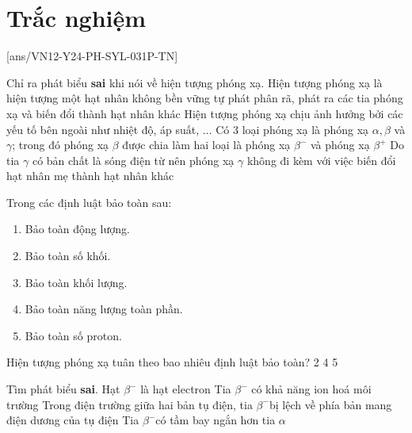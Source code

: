 \let\lesson\undefined
\newcommand{\lesson}{\phantomlesson{Bài 17.}}
\let\lesson\undefined
\newcommand{\lesson}{\phantomlesson{Bài 17.}}


\setcounter{section}{2}
\section{Trắc nghiệm}
[ans/VN12-Y24-PH-SYL-031P-TN]
\setcounter{ex}{0}
\begin{ex}
	Chỉ ra phát biểu \textbf{sai} khi nói về hiện tượng phóng xạ.
	\choice
	{Hiện tượng phóng xạ là hiện tượng một hạt nhân không bền vững tự phát phân rã, phát ra các tia phóng xạ và biến đổi thành hạt nhân khác}
	{\True Hiện tượng phóng xạ chịu ảnh hưởng bởi các yếu tố bên ngoài như nhiệt độ, áp suất, $\dots$}
	{Có 3 loại phóng xạ là phóng xạ $\alpha, \beta$ và $\gamma$; trong đó phóng xạ $\beta$ được chia làm hai loại là phóng xạ $\beta^-$ và phóng xạ $\beta^{+}$}
	{Do tia $\gamma$ có bản chất là sóng điện từ nên phóng xạ $\gamma$ không đi kèm với việc biến đổi hạt nhân mẹ thành hạt nhân khác}
	\loigiai{

	}
\end{ex}
\begin{ex}
	Trong các định luật bảo toàn sau:
	\begin{enumerate}[label=(\arabic*)]
		\item Bảo toàn động lượng.
		\item Bảo toàn số khối.
		\item Bảo toàn khối lượng.
		\item Bảo toàn năng lượng toàn phần.
		\item Bảo toàn số proton.
	\end{enumerate}
	Hiện tượng phóng xạ tuân theo bao nhiêu định luật bảo toàn?
	\choice
	{2}
	{}
	{4}
	{5}
\end{ex}
\begin{ex}
	Tìm phát biểu \textbf{sai}.
	\choice
	{Hạt $\beta^{-}$ là hạt electron}
	{Tia $\beta^{-}$ có khả năng ion hoá môi trường}
	{Trong điện trường giữa hai bản tụ điện, tia $\beta^{-}$bị lệch về phía bản mang điện dương của tụ điện}
	{\True Tia $\beta^{-}$có tầm bay ngắn hơn tia $\alpha$}
	\loigiai{}
\end{ex}
